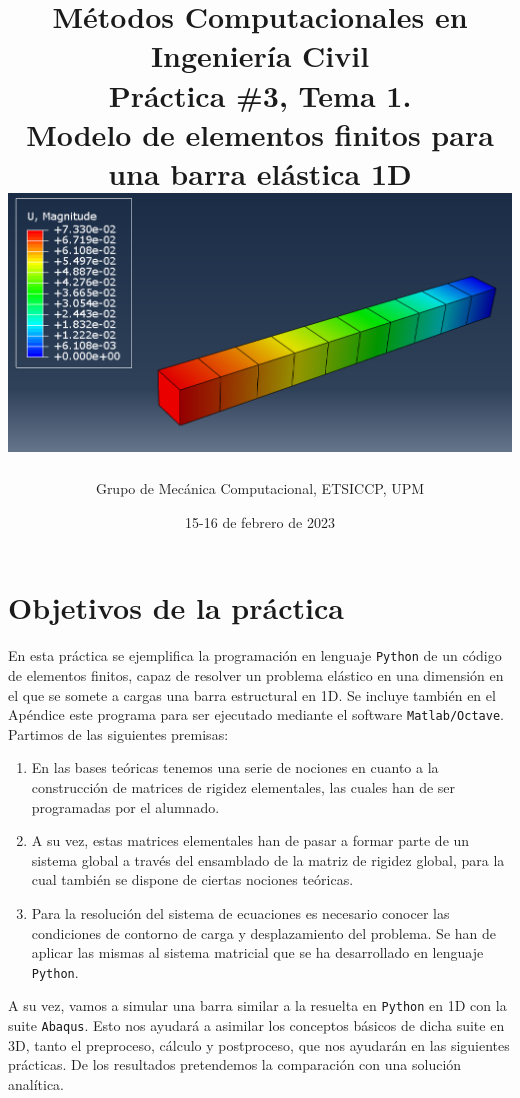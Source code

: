 \documentclass[spanish,a4paper,12pt]{article}
\title{\vspace*{-4ex}
	\bf\normalsize
	Métodos Computacionales en Ingeniería Civil\\
	\Large
	Práctica \#3, Tema 1.\\
	Modelo de elementos finitos para una barra elástica 1D\\[3ex]
	\includegraphics[width=0.65\linewidth]{figuras/barra_portada.png}%
	}
\author{%
        {\small\sc 
	Grupo de Mecánica Computacional, ETSICCP, UPM}}
\date{15-16 de febrero de 2023}
\begin{document}
\pagestyle{fancy}
\lhead[\fancyplain{}{\thepage}]{\fancyplain{}{\rightmark}}
\rhead[\fancyplain{}{\leftmark}]{\fancyplain{}{\thepage}}
\cfoot[\fancyplain{\thepage}{}]{\fancyplain{\thepage}{}}

\renewcommand{\sectionmark}[1]{\markright{\sf Aptdo.\ \thesection. #1}{}}
\renewcommand*\lstlistingname{Código}

\maketitle

\tableofcontents


\clearpage

\section{Objetivos de la práctica}
\label{sec:objetivos}

En esta práctica se ejemplifica la programación en lenguaje \texttt{Python} de un código de elementos finitos, capaz de resolver un problema elástico en una dimensión en el que se somete a cargas una barra estructural en 1D. Se incluye también en el Apéndice este programa para ser ejecutado mediante el software \texttt{Matlab/Octave}. Partimos de las siguientes premisas:
\begin{enumerate}
	\item
	En las bases teóricas tenemos una serie de nociones en cuanto a la construcción de matrices de rigidez elementales, las cuales han de ser programadas por el alumnado.
	\item
	A su vez, estas matrices elementales han de pasar a formar parte de un sistema global a través del ensamblado de la matriz de rigidez global, para la cual también se dispone de ciertas nociones teóricas.
	\item
	Para la resolución del sistema de ecuaciones es necesario conocer las condiciones de contorno de carga y desplazamiento del problema. Se han de aplicar las mismas al sistema matricial que se ha desarrollado en lenguaje \texttt{Python}.
\end{enumerate}

A su vez, vamos a simular una barra similar a la resuelta en \texttt{Python} en 1D con la suite \texttt{Abaqus}. Esto nos ayudará a asimilar los conceptos básicos de dicha suite en 3D, tanto el preproceso, cálculo y postproceso, que nos ayudarán en las siguientes prácticas. De los resultados pretendemos la comparación con una solución analítica.
\end{document}
